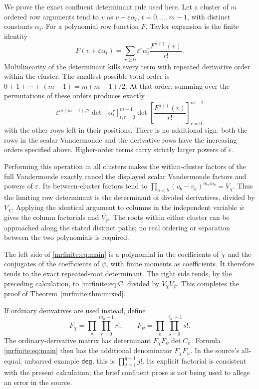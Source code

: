 \documentclass[11pt]{article}
\begin{document}
We prove the exact confluent determinant rule used here. Let a cluster
of \(m\) ordered row arguments tend to \(v\) as
\(v+\varepsilon\alpha_t\), \(t=0,\ldots,m-1\), with distinct constants
\(\alpha_t\). For a polynomial row function \(F\), Taylor expansion is
the finite identity
\[
 F(v+\varepsilon\alpha_t)
  =\sum_{r\geq0}\varepsilon^r\alpha_t^r\frac{F^{(r)}(v)}{r!}.
\]
Multilinearity of the determinant kills every term with repeated
derivative order within the cluster. The smallest possible total order
is \(0+1+\cdots+(m-1)=m(m-1)/2\). At that order, summing over the
permutations of these orders produces exactly
\[
 \varepsilon^{m(m-1)/2}
  \det[\alpha_t^r]_{t,r=0}^{m-1}
  \det\left[\frac{F^{(r)}(v)}{r!}\right]_{r=0}^{m-1}
\]
with the other rows left in their positions. There is no additional
sign: both the rows in the scalar Vandermonde and the derivative rows
have the increasing orders specified above. Higher-order terms carry
strictly larger powers of \(\varepsilon\).

Performing this operation in all clusters makes the within-cluster
factors of the full Vandermonde exactly cancel the displayed scalar
Vandermonde factors and powers of \(\varepsilon\). Its between-cluster
factors tend to \(\prod_{a<b}(v_b-v_a)^{m_am_b}=V_\chi\).
Thus the limiting row determinant is the determinant of divided
derivatives, divided by \(V_\chi\). Applying the identical argument to
columns in the independent variable \(\overline w\) gives the column
factorials and \(\overline{V_\psi}\). The roots within either cluster
can be approached along the stated distinct paths; no real ordering or
separation between the two polynomials is required.

The left side of \eqref{mrfinite:eq:main} is a polynomial in the coefficients of
\(\chi\) and the conjugates of the coefficients of \(\psi\), with
finite moments as coefficients. It therefore tends to the exact
repeated-root determinant. The right side tends, by the preceding
calculation, to \eqref{mrfinite:eq:C} divided by
\(V_\chi\overline{V_\psi}\). This completes the proof of
Theorem~\ref{mrfinite:thm:mixed}.

If ordinary derivatives are used instead, define
\[
 F_\chi=\prod_a\prod_{r=0}^{m_a-1}r!,\qquad
 F_\psi=\prod_b\prod_{s=0}^{\ell_b-1}s!.
\]
The ordinary-derivative matrix has determinant
\(F_\chi F_\psi\det C_n\). Formula \eqref{mrfinite:eq:main} then has the
additional denominator \(F_\chi F_\psi\).
In the source's all-equal, unbarred example \texttt{deg}, this is
\(\prod_{j=1}^{q-1}j!\). Its explicit factorial is consistent with the
present calculation; the brief confluent prose is not being used to
allege an error in the source.
\end{document}
